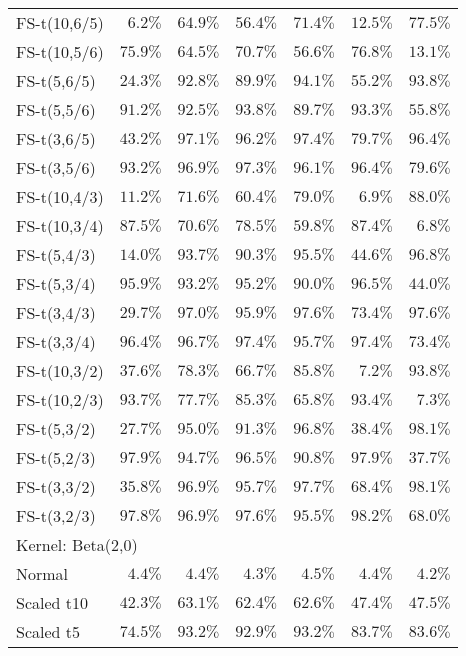 \begin{longtable}{lrrrrrr}
FS-t(10,6/5) & $6.2\%$ & $64.9\%$ & $56.4\%$ & $71.4\%$ & $12.5\%$ & $77.5\%$ \\ 
FS-t(10,5/6) & $75.9\%$ & $64.5\%$ & $70.7\%$ & $56.6\%$ & $76.8\%$ & $13.1\%$ \\ 
FS-t(5,6/5) & $24.3\%$ & $92.8\%$ & $89.9\%$ & $94.1\%$ & $55.2\%$ & $93.8\%$ \\ 
FS-t(5,5/6) & $91.2\%$ & $92.5\%$ & $93.8\%$ & $89.7\%$ & $93.3\%$ & $55.8\%$ \\ 
FS-t(3,6/5) & $43.2\%$ & $97.1\%$ & $96.2\%$ & $97.4\%$ & $79.7\%$ & $96.4\%$ \\ 
FS-t(3,5/6) & $93.2\%$ & $96.9\%$ & $97.3\%$ & $96.1\%$ & $96.4\%$ & $79.6\%$ \\ 
FS-t(10,4/3) & $11.2\%$ & $71.6\%$ & $60.4\%$ & $79.0\%$ & $6.9\%$ & $88.0\%$ \\ 
FS-t(10,3/4) & $87.5\%$ & $70.6\%$ & $78.5\%$ & $59.8\%$ & $87.4\%$ & $6.8\%$ \\ 
FS-t(5,4/3) & $14.0\%$ & $93.7\%$ & $90.3\%$ & $95.5\%$ & $44.6\%$ & $96.8\%$ \\ 
FS-t(5,3/4) & $95.9\%$ & $93.2\%$ & $95.2\%$ & $90.0\%$ & $96.5\%$ & $44.0\%$ \\ 
FS-t(3,4/3) & $29.7\%$ & $97.0\%$ & $95.9\%$ & $97.6\%$ & $73.4\%$ & $97.6\%$ \\ 
FS-t(3,3/4) & $96.4\%$ & $96.7\%$ & $97.4\%$ & $95.7\%$ & $97.4\%$ & $73.4\%$ \\ 
FS-t(10,3/2) & $37.6\%$ & $78.3\%$ & $66.7\%$ & $85.8\%$ & $7.2\%$ & $93.8\%$ \\ 
FS-t(10,2/3) & $93.7\%$ & $77.7\%$ & $85.3\%$ & $65.8\%$ & $93.4\%$ & $7.3\%$ \\ 
FS-t(5,3/2) & $27.7\%$ & $95.0\%$ & $91.3\%$ & $96.8\%$ & $38.4\%$ & $98.1\%$ \\ 
FS-t(5,2/3) & $97.9\%$ & $94.7\%$ & $96.5\%$ & $90.8\%$ & $97.9\%$ & $37.7\%$ \\ 
FS-t(3,3/2) & $35.8\%$ & $96.9\%$ & $95.7\%$ & $97.7\%$ & $68.4\%$ & $98.1\%$ \\ 
FS-t(3,2/3) & $97.8\%$ & $96.9\%$ & $97.6\%$ & $95.5\%$ & $98.2\%$ & $68.0\%$ \\ 
\midrule
\multicolumn{7}{l}{Kernel: Beta(2,0)} \\ 
\midrule
Normal & $4.4\%$ & $4.4\%$ & $4.3\%$ & $4.5\%$ & $4.4\%$ & $4.2\%$ \\ 
Scaled t10 & $42.3\%$ & $63.1\%$ & $62.4\%$ & $62.6\%$ & $47.4\%$ & $47.5\%$ \\ 
Scaled t5 & $74.5\%$ & $93.2\%$ & $92.9\%$ & $93.2\%$ & $83.7\%$ & $83.6\%$ \\ 

\end{longtable}
